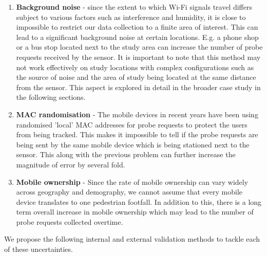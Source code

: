 \begin{enumerate} 
\item 
\textbf{Background noise} - since the extent to which Wi-Fi signals travel
		differs subject to various factors such as interference and humidity, it
		is close to impossible to restrict our data collection to a finite area
		of interest. This can lead to a significant background noise at certain
		locations. E.g. a phone shop or a bus stop located next to the study
		area can increase the number of probe requests received by the sensor.
		It is important to note that this method may not work effectively on
		study locations with complex configurations such as the source of noise
		and the area of study being located at the same distance from the
		sensor. This aspect is explored in detail in the broader case study in
		the following sections.
\item 
\textbf{MAC randomisation} - The mobile devices in recent years have been using
		randomised 'local' MAC addresses for probe requests to protect the users
		from being tracked. This makes it impossible to tell if the probe
		requests are being sent by the same mobile device which is being
		stationed next to the sensor. This along with the previous problem can
		further increase the magnitude of error by several fold.
\item
\textbf{Mobile ownership} - Since the rate of mobile ownership can vary widely
		across geography and demography, we cannot assume that every mobile
		device translates to one pedestrian footfall. In addition to this, there
		is a long term overall increase in mobile ownership which may lead to
		the number of probe requests collected overtime.
\end{enumerate}

We propose the following internal and external validation methods to tackle each
of these uncertainties.


